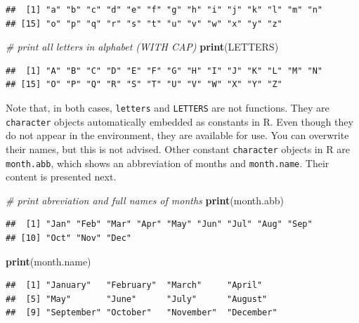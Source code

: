 \documentclass[11pt,]{book}
\newenvironment{Shaded}{\begin{snugshade}}{\end{snugshade}}
\newcommand{\KeywordTok}[1]{\textcolor[rgb]{0.27,0.27,0.27}{\textbf{#1}}}
\newcommand{\CommentTok}[1]{\textcolor[rgb]{0.56,0.35,0.01}{\textit{#1}}}
\newcommand{\NormalTok}[1]{#1}
\begin{document}
\begin{verbatim}
##  [1] "a" "b" "c" "d" "e" "f" "g" "h" "i" "j" "k" "l" "m" "n"
## [15] "o" "p" "q" "r" "s" "t" "u" "v" "w" "x" "y" "z"
\end{verbatim}

\begin{Shaded}
\begin{Highlighting}[]
\CommentTok{# print all letters in alphabet (WITH CAP)}
\KeywordTok{print}\NormalTok{(LETTERS)}
\end{Highlighting}
\end{Shaded}

\begin{verbatim}
##  [1] "A" "B" "C" "D" "E" "F" "G" "H" "I" "J" "K" "L" "M" "N"
## [15] "O" "P" "Q" "R" "S" "T" "U" "V" "W" "X" "Y" "Z"
\end{verbatim}

Note that, in both cases, \texttt{letters} and \texttt{LETTERS} are not
functions. They are \texttt{character} objects automatically embedded as
constants in R. Even though they do not appear in the environment, they
are available for use. You can overwrite their names, but this is not
advised. Other constant \texttt{character} objects in R are
\texttt{month.abb}, which shows an abbreviation of months and
\texttt{month.name}. Their content is presented next.
 
 

\begin{Shaded}
\begin{Highlighting}[]
\CommentTok{# print abreviation and full names of months}
\KeywordTok{print}\NormalTok{(month.abb)    }
\end{Highlighting}
\end{Shaded}

\begin{verbatim}
##  [1] "Jan" "Feb" "Mar" "Apr" "May" "Jun" "Jul" "Aug" "Sep"
## [10] "Oct" "Nov" "Dec"
\end{verbatim}

\begin{Shaded}
\begin{Highlighting}[]
\KeywordTok{print}\NormalTok{(month.name)   }
\end{Highlighting}
\end{Shaded}

\begin{verbatim}
##  [1] "January"   "February"  "March"     "April"    
##  [5] "May"       "June"      "July"      "August"   
##  [9] "September" "October"   "November"  "December"
\end{verbatim}
\end{document}
